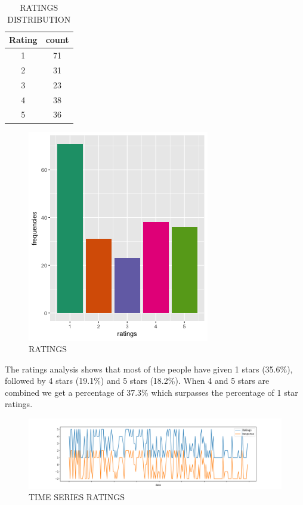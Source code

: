 \documentclass[a4paper, 12pt]{extarticle}
\begin{document}
{\begin{table}[H]
\centering
\begin{tabular}{|c|c|}
\hline
Rating & count \\
\hline
1 & 71 \\
\hline
2 & 31 \\
\hline
3 & 23 \\
\hline
4 & 38 \\
\hline
5 & 36 \\
\hline
\end{tabular}
\caption{RATINGS DISTRIBUTION}
\end{table}
\begin{figure}[H]
\centering
\includegraphics[scale=1]{ratings_distribution.png}
\caption{RATINGS}
\end{figure}

The ratings analysis shows that most of the people have given 1 stars (35.6\%), followed by 4 stars (19.1\%) and 5 stars (18.2\%). When 4 and 5 stars are combined we get a percentage of 37.3\% which surpasses the percentage of 1 star ratings. 
\begin{figure}[H]
\centering
\includegraphics[scale=0.5]{rat_res.png}
\caption{TIME SERIES RATINGS}
\label{fig:rat_res}
\end{figure}

}
\end{document}
